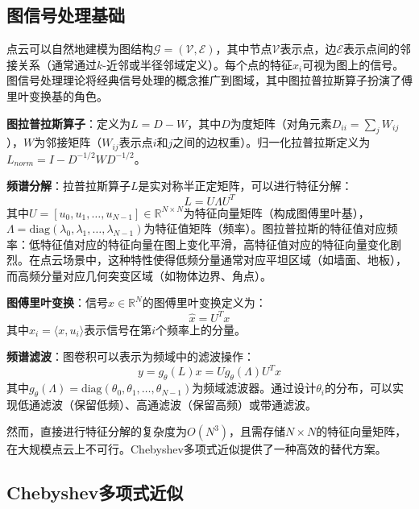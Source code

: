 \documentclass[12pt,a4paper,openany,oneside]{ctexbook}
\theoremstyle{definition}
\theoremstyle{remark}
\begin{document}
\subsection{图信号处理基础}

点云可以自然地建模为图结构$\mathcal{G} = (\mathcal{V}, \mathcal{E})$，其中节点$\mathcal{V}$表示点，边$\mathcal{E}$表示点间的邻接关系（通常通过$k$-近邻或半径邻域定义）。每个点的特征$x_i$可视为图上的信号。图信号处理理论\cite{shuman2013emerging}将经典信号处理的概念推广到图域，其中图拉普拉斯算子扮演了傅里叶变换基的角色。

\textbf{图拉普拉斯算子}：定义为$L = D - W$，其中$D$为度矩阵（对角元素$D_{ii} = \sum_j W_{ij}$），$W$为邻接矩阵（$W_{ij}$表示点$i$和$j$之间的边权重）。归一化拉普拉斯定义为$L_{norm} = I - D^{-1/2}WD^{-1/2}$。

\textbf{频谱分解}：拉普拉斯算子$L$是实对称半正定矩阵，可以进行特征分解：
\begin{equation}
L = U\Lambda U^T
\end{equation}
其中$U = [u_0, u_1, \ldots, u_{N-1}] \in \mathbb{R}^{N \times N}$为特征向量矩阵（构成图傅里叶基），$\Lambda = \text{diag}(\lambda_0, \lambda_1, \ldots, \lambda_{N-1})$为特征值矩阵（频率）。图拉普拉斯的特征值对应频率：低特征值对应的特征向量在图上变化平滑，高特征值对应的特征向量变化剧烈\cite{shuman2013emerging}。在点云场景中，这种特性使得低频分量通常对应平坦区域（如墙面、地板），而高频分量对应几何突变区域（如物体边界、角点）。

\textbf{图傅里叶变换}：信号$x \in \mathbb{R}^N$的图傅里叶变换定义为：
\begin{equation}
\hat{x} = U^T x
\end{equation}
其中$\hat{x}_i = \langle x, u_i \rangle$表示信号在第$i$个频率上的分量。

\textbf{频谱滤波}：图卷积可以表示为频域中的滤波操作\cite{defferrard2016convolutional}：
\begin{equation}
y = g_\theta(L)x = Ug_\theta(\Lambda)U^Tx
\end{equation}
其中$g_\theta(\Lambda) = \text{diag}(\theta_0, \theta_1, \ldots, \theta_{N-1})$为频域滤波器。通过设计$\theta_i$的分布，可以实现低通滤波（保留低频）、高通滤波（保留高频）或带通滤波。

然而，直接进行特征分解的复杂度为$O(N^3)$，且需存储$N \times N$的特征向量矩阵，在大规模点云上不可行。Chebyshev多项式近似提供了一种高效的替代方案。

\subsection{Chebyshev多项式近似}
\end{document}
